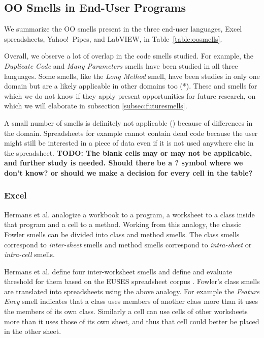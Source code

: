\documentclass[10pt,conference,compsocconf]{IEEEtran}
\newcommand{\todo}[1]{\textbf{TODO: #1}}
\begin{document}
\subsection{OO Smells in End-User Programs}
 We summarize the OO smells present in the three end-user languages, Excel spreadsheets, Yahoo!\ Pipes, and LabVIEW, in Table~\ref{table:oosmells}.
 
 Overall, we observe a lot of overlap in the code smells studied. For example, the \emph{Duplicate Code} and \emph{Many Parameters} smells have been studied in all three languages. Some smells, like the \emph{Long Method} smell, have been studies in only one domain but are a likely applicable in other domains too (*). These and smells for which we do not know if they apply present opportunities for future research, on which we will elaborate in subsection \ref{subsec:futuresmells}.
 
 A small number of smells is definitely not applicable () because of differences in the domain. Spreadsheets for example cannot contain dead code because the user might still be interested in a piece of data even if it is not used anywhere else in the spreadsheet.
\todo{The blank cells may or may not be applicable, and further study is needed. Should there be a ? symbol where we don't know? or should we make a decision for every cell in the table?}
 
 \subsubsection{Excel}
Hermans et al. \cite{Hermans2012inter} \cite{Hermans2012intra} analogize a workbook to a program, a worksheet to a class inside that program and a cell to a method.
Working from this analogy, the classic Fowler smells can be divided into class and method smells.
The class smells correspond to \textit{inter-sheet} smells and method smells correspond to \textit{intra-sheet} or \textit{intra-cell} smells.

Hermans et al. \cite{Hermans2012inter} define four inter-worksheet smells and define and evaluate threshold for them based on the EUSES spreadsheet corpus \cite{fisher2005euses}.
Fowler's class smells are translated into spreadsheets using the above analogy. 
For example the \textit{Feature Envy} smell indicates that a class uses members of another class more than it uses the members of its own class.
Similarly a cell can use cells of other worksheets more than it uses those of its own sheet, and thus that cell could better be placed in the other sheet.
\end{document}
